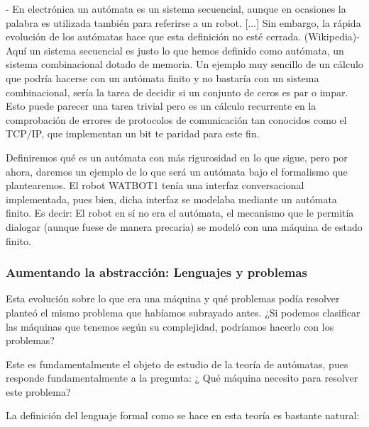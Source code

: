 - En electrónica un autómata es un sistema secuencial, aunque en ocasiones la palabra es utilizada también para referirse a un robot. [...] Sin embargo, la rápida evolución de los autómatas hace que esta definición no esté cerrada. (Wikipedia)- \\

Aquí un sistema secuencial es justo lo que hemos definido como autómata, un sistema combinacional dotado de memoria.  Un ejemplo muy sencillo de un cálculo que podría hacerse con un autómata finito y no bastaría con un sistema combinacional, sería la tarea de decidir si un conjunto de ceros es par o impar. Esto puede parecer una tarea trivial pero es un cálculo recurrente en la comprobación de errores de protocolos de comunicación tan conocidos como el TCP/IP, que implementan un bit te paridad para este fin.

\vspace{10px}


Definiremos qué es un autómata con más rigurosidad en lo que sigue, pero por ahora, daremos un ejemplo de lo que será un autómata bajo el formalismo que plantearemos. El robot WATBOT1 tenía una interfaz conversacional implementada, pues bien, dicha interfaz se modelaba mediante un autómata finito. Es decir: El robot en sí no era el autómata, el mecanismo que le permitía dialogar (aunque fuese de manera precaria) se modeló con una máquina de estado finito.

\subsubsection{Aumentando la abstracción: Lenguajes y problemas }


Esta evolución sobre lo que era una máquina y qué problemas podía resolver planteó el mismo problema que habíamos subrayado antes. ¿Si podemos clasificar las máquinas que tenemos según su complejidad, podríamos hacerlo con los problemas?

\vspace{10px}

Este es fundamentalmente el objeto de estudio de la teoría de autómatas, pues responde fundamentalmente a la pregunta: ¿ Qué máquina necesito para resolver este problema?

\vspace{10px}

La definición del lenguaje formal como se hace en esta teoría es bastante natural:

\vspace{10px}


